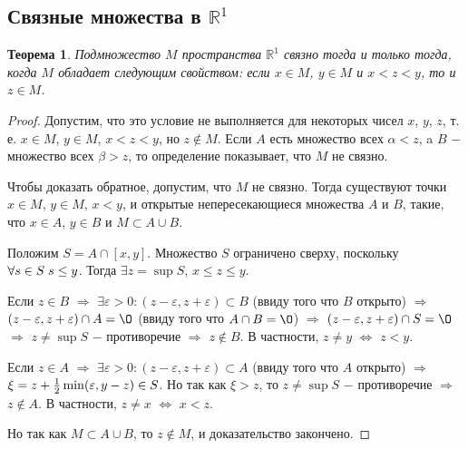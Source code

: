 \documentclass{article}
\newtheorem{theorem}{Теорема}[section]
\begin{document}
\subsection{Связные множества в \(\mathbb{R}^1\)}

\begin{theorem}
Подмножество \(M\) пространства \(\mathbb{R}^1\) связно тогда и только тогда, когда \(M\) обладает следующим свойством: если \(x \in M\), \(y \in M\) и \(x < z < y\), то и \(z \in M\).
\end{theorem}

\begin{proof}
Допустим, что это условие не выполняется для некоторых чисел \(x\), \(y\), \(z\), т. е. \(x \in M\), \(y \in M\), \(x < z < y\), но \(z \notin M\). Если \(A\) есть множество всех \(\alpha < z\), a \(B\) \(-\) множество всех \(\beta > z\), то определение показывает, что \(M\) не связно.

Чтобы доказать обратное, допустим, что \(M\) не связно. Тогда существуют точки \(x \in M\), \(y \in M\), \(x < y\), и открытые непересекающиеся множества \(A\) и \(B\), такие, что \(x \in A\), \(y \in B\) и \(M \subset A \cup B\).

Положим \(S = A \cap [x, y]\). Множество \(S\) ограничено сверху, поскольку \(\forall s \in S \hspace{1mm} s \leq y\). Тогда \(\exists z = \sup S\), \(x \leq z \leq y\).

Если \(z \in B\) \(\Rightarrow\) \(\exists \varepsilon > 0 : (z - \varepsilon, z + \varepsilon) \subset B\) (ввиду того что \(B\) открыто) \(\Rightarrow\) \((z - \varepsilon, z + \varepsilon) \cap A = \O\) (ввиду того что \(A \cap B = \O\)) \(\Rightarrow\) \((z - \varepsilon, z + \varepsilon) \cap S = \O\) \(\Rightarrow\) \(z \neq \sup S\) \(-\) противоречие \(\Rightarrow\) \(z \notin B\). В частности, \(z \neq y\) \(\Leftrightarrow\) \(z < y\).

Если \(z \in A\) \(\Rightarrow\) \(\exists \varepsilon > 0 : (z - \varepsilon, z + \varepsilon) \subset A\) (ввиду того что \(A\) открыто) \(\Rightarrow\) \(\xi = z + {1 \over 2}\min(\varepsilon, y - z) \in S\). Но так как \(\xi > z\), то \(z \neq \sup S\) \(-\) противоречие \(\Rightarrow\) \(z \notin A\). В частности, \(z \neq x\) \(\Leftrightarrow\) \(x < z\).

Но так как \(M \subset A \cup B\), то \(z \notin M\), и доказательство закончено.
\end{proof}
\end{document}
